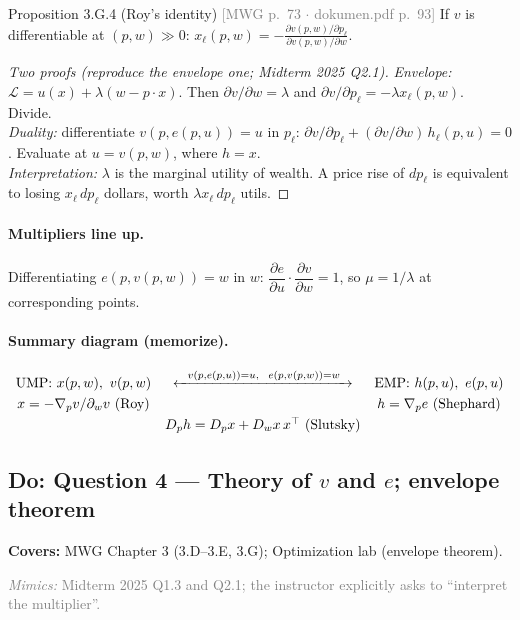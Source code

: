 \documentclass[11pt]{article}
\newcommand{\T}{^{\top}}
\newcommand{\mwg}[2]{\hfill{\small\textcolor{gray}{[MWG p.~#1 $\cdot$ dokumen.pdf p.~#2]}}}
\newcommand{\covers}[1]{\par\noindent\textcolor{blue!60!black}{\small\textbf{Covers:} #1}\medskip}
\newcommand{\mimic}[1]{\par\noindent\textcolor{gray}{\small\textit{Mimics:} #1}\medskip}
\begin{document}
\begin{prop}{Proposition 3.G.4 (Roy's identity) \mwg{73}{93}}
If $v$ is differentiable at $(p,w)\gg0$: $\displaystyle x_\ell(p,w)=-\frac{\partial v(p,w)/\partial p_\ell}{\partial v(p,w)/\partial w}$.
\end{prop}
\begin{proof}[Two proofs (reproduce the envelope one; Midterm 2025 Q2.1)]
\emph{Envelope:} $\mathcal{L}=u(x)+\lambda(w-p\cdot x)$. Then $\partial v/\partial w=\lambda$ and $\partial v/\partial p_\ell=-\lambda x_\ell(p,w)$. Divide.\\
\emph{Duality:} differentiate $v(p,e(p,u))=u$ in $p_\ell$: $\partial v/\partial p_\ell+(\partial v/\partial w)\,h_\ell(p,u)=0$. Evaluate at $u=v(p,w)$, where $h=x$.\\
\emph{Interpretation:} $\lambda$ is the marginal utility of wealth. A price rise of $dp_\ell$ is equivalent to losing $x_\ell\,dp_\ell$ dollars, worth $\lambda x_\ell\,dp_\ell$ utils.
\end{proof}

\paragraph{Multipliers line up.} Differentiating $e(p,v(p,w))=w$ in $w$: $\dfrac{\partial e}{\partial u}\cdot\dfrac{\partial v}{\partial w}=1$, so $\mu=1/\lambda$ at corresponding points.

\paragraph{Summary diagram (memorize).}
\[
\begin{array}{ccc}
\text{UMP: } x(p,w),\ v(p,w) & \xleftrightarrow{\ \ v(p,e(p,u))=u,\ \ e(p,v(p,w))=w\ \ } & \text{EMP: } h(p,u),\ e(p,u)\\[3pt]
x=-\nabla_pv/\partial_wv\ \text{(Roy)} & & h=\nabla_pe\ \text{(Shephard)}\\[3pt]
& D_ph=D_px+D_wx\,x\T\ \text{(Slutsky)} &
\end{array}
\]

\subsection{Do: Question 4 --- Theory of $v$ and $e$; envelope theorem}
\covers{MWG Chapter 3 (3.D--3.E, 3.G); Optimization lab (envelope theorem).}
\mimic{Midterm 2025 Q1.3 and Q2.1; the instructor explicitly asks to ``interpret the multiplier''.}
\end{document}
